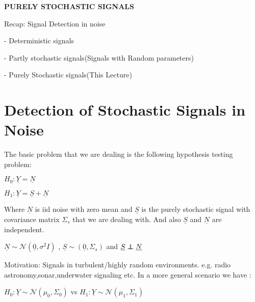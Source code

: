 \documentclass[12pt]{report}
\newcommand\independent{\protect\mathpalette{\protect\independenT}{\perp}}
\def\independenT#1#2{\mathrel{\rlap{$#1#2$}\mkern2mu{#1#2}}}
\begin{document}
	\maketitle
	
	\begin{center}
		{\Large \bf  PURELY STOCHASTIC SIGNALS }
	\end{center}
	Recap: Signal Detection in noise
	
	    - Deterministic signals

	    - Partly stochastic signals(Signals with Random parameters)
	
	    - Purely Stochastic signals(This Lecture)
	
	\section{Detection of Stochastic Signals in Noise}
	The basic problem that we are dealing is the following hypothesis testing problem:
	\begin{center}
		$H_0 :  \underline{Y}  =   \underline{N}$
	\end{center}
	\begin{center}
		$H_1 : \underline{Y} =  \underline{S}+ \underline{N}$
	\end{center}
	
	\noindent Where $\underline{N}$ is iid noise with zero mean and $\underline{S}$ is the purely stochastic signal with covariance matrix $\Sigma_s$ that we are dealing with. And also $\underline{S}$ and $\underline{N}$ are independent. 
	
	\begin{center}
		$\underline{N}\sim \mathcal{N}(\underline{0},\sigma^2I )$ , $\underline{S}\sim(\underline{0},\Sigma_s )$ and $\underline{S} \independent \underline{N}$ \par
	\end{center}
	\noindent Motivation: Signals in turbulent/highly random environments. e.g. radio astronomy,sonar,underwater signaling etc. In a more general scenario we have :
	
	\begin{center}
		$ H_0 :  \underline{Y}\sim  \mathcal{N}(\mu_0,\Sigma_0 )$
		\linebreak
		vs 
		\linebreak
		$ H_1 : \underline{Y}\sim \mathcal{N}(\mu_1,\Sigma_1 )$
	\end{center}
	
\end{document}
